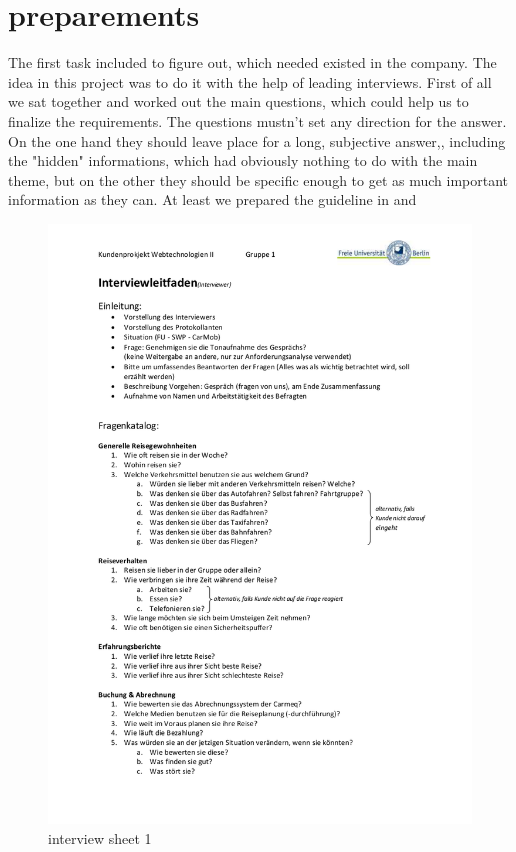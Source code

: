 
\section{preparements}
The first task included to figure out, which needed existed in the company. The idea in this project was to do it with the help of
 leading interviews.
First of all we sat together and worked out the main questions, which could help us to finalize the requirements. The questions
mustn't set any direction for the answer. On the one hand they should leave place for a long, subjective answer,, including the
"hidden" informations, which had obviously nothing to do with the main theme, but on the other they should be specific
enough to get as much important information as they can. At least we prepared the guideline in  and 

\begin{figure}[!h]
	\centering
	\includegraphics[width=\textwidth, page=1, scale=0.9]{images/Interviewbogen.png}
	\caption{interview sheet 1}
	\label{fig:interview1}
\end{figure}

